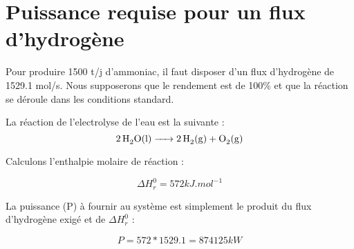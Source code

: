 \documentclass[10pt,a4paper]{article}
\begin{document}
\section{Puissance requise pour un flux d'hydrogène}

Pour produire 1500 t/j d'ammoniac, il faut disposer d'un flux d'hydrogène de 1529.1 mol/s. Nous supposerons que le rendement est de 100\% et que la réaction se déroule dans les conditions standard. 

La réaction de l'electrolyse de l'eau est la suivante : $$\ce {2H2O(l) -> 2H2(g) + O2(g)}$$ 

Calculons l'enthalpie molaire de réaction :

$$ \Delta H_r^0 =  \unit{572}{kJ.mol^{-1}} $$

La puissance (P) à fournir au système est simplement le produit du flux d'hydrogène exigé et de $ \Delta H_r^0$ :

$$ P = 572*1529.1 = \unit{874 125}{kW} $$
\end{document}
